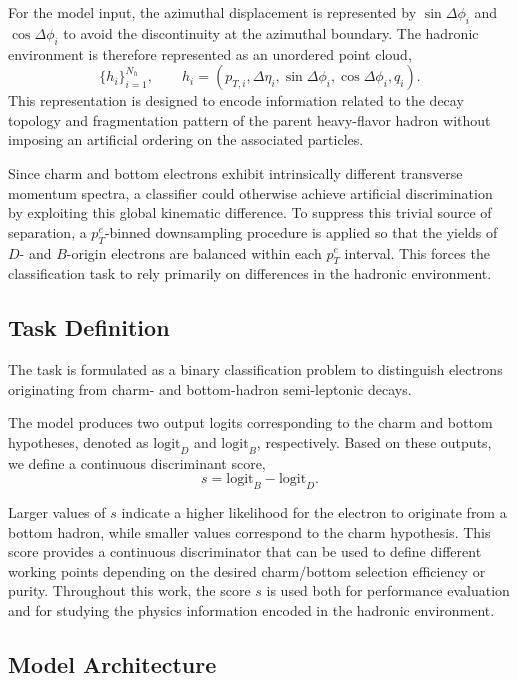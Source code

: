 \documentclass[preprint,12pt]{elsarticle}
\begin{document}
For the model input, the azimuthal displacement is represented by $\sin\Delta\phi_i$ and $\cos\Delta\phi_i$ to avoid the discontinuity at the azimuthal boundary. The hadronic environment is therefore represented as an unordered point cloud,
\[
\{h_i\}_{i=1}^{N_h}, \qquad
h_i = (p_{T,i}, \Delta\eta_i, \sin\Delta\phi_i, \cos\Delta\phi_i, q_i).
\]
This representation is designed to encode information related to the decay topology and fragmentation pattern of the parent heavy-flavor hadron without imposing an artificial ordering on the associated particles.

Since charm and bottom electrons exhibit intrinsically different transverse momentum spectra, a classifier could otherwise achieve artificial discrimination by exploiting this global kinematic difference. To suppress this trivial source of separation, a $p_T^e$-binned downsampling procedure is applied so that the yields of $D$- and $B$-origin electrons are balanced within each $p_T^e$ interval. This forces the classification task to rely primarily on differences in the hadronic environment.

\subsection{Task Definition}

The task is formulated as a binary classification problem to distinguish electrons originating from charm- and bottom-hadron semi-leptonic decays.

The model produces two output logits corresponding to the charm and bottom hypotheses, denoted as $\mathrm{logit}_D$ and $\mathrm{logit}_B$, respectively. Based on these outputs, we define a continuous discriminant score,
\[
s = \mathrm{logit}_B - \mathrm{logit}_D.
\]

Larger values of $s$ indicate a higher likelihood for the electron to originate from a bottom hadron, while smaller values correspond to the charm hypothesis. This score provides a continuous discriminator that can be used to define different working points depending on the desired charm/bottom selection efficiency or purity. Throughout this work, the score $s$ is used both for performance evaluation and for studying the physics information encoded in the hadronic environment.

\subsection{Model Architecture}
\end{document}
